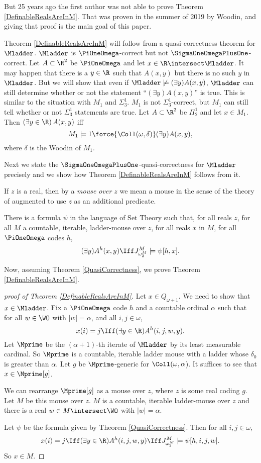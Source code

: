 \documentclass[oneside,12pt]{amsart}
\begin{document}
But 25 years ago the first author was not able to prove Theorem \ref{DefinableRealsAreInM}.
That was proven in the summer of 2019 by Woodin, and giving that proof is the
main goal of this paper.

Theorem \ref{DefinableRealsAreInM} will follow from a quasi-correctness theorem
for $\Mladder$. $\Mladder$ is $\PiOneOmega$-correct but not $\SigmaOneOmegaPlusOne$-correct.
Let $A\subset\R^2$ be $\PiOneOmega$ and let $x\in\R\intersect\Mladder$. It may
happen that there is a $y\in \R$ such that $A(x,y)$ but there is no such $y$
in $\Mladder$. But we will show that even if $\Mladder\not\models(\exists y) A(x,y)$,
$\Mladder$ can still determine whether or not the statement
``$(\exists y) A(x,y)$'' is true. This is similar to the situation with $M_1$ and
$\Sigma^1_3$. $M_1$ is not $\Sigma^1_3$-correct, but $M_1$ can still tell whether
or not $\Sigma^1_3$ statements are true. Let $A\subset\R^2$ be $\Pi^1_2$ and
let $x\in M_1$. Then $(\exists y\in\R)\, A(x,y)$ iff
$$M_1\models 1\force{\Coll(\omega,\delta)} (\exists y) A(x,y),$$
where $\delta$ is the Woodin of $M_1$.

Next we state the
$\SigmaOneOmegaPlusOne$-quasi-correctness for $\Mladder$ precisely and
we show how
Theorem \ref{DefinableRealsAreInM} follows from it.

If $z$ is a real, then by a \emph{mouse over $z$} we mean a mouse in the
sense of the theory of \cite{FSIT} augmented to use $z$ as an additional predicate.

\begin{theorem}
\label{QuasiCorrectness}
There is a formula $\psi$ in the language of Set Theory such that, for all
reals $z$, for all $M$ a countable, iterable, ladder-mouse over $z$,
for all reals $x$ in $M$,
for all $\PiOneOmega$ codes $h$,
$$(\exists y) A^h(x,y) \Iff J^M_{\omega_2^M} \models \psi[h,x].$$
\end{theorem}

Now, assuming Theorem \ref{QuasiCorrectness}, we prove Theorem \ref{DefinableRealsAreInM}.

\begin{proof}[proof of Theorem \ref{DefinableRealsAreInM}]
Let $x\in Q_{\omega+1}$. We need to show that $x\in\Mladder$.
Fix a $\PiOneOmega$ code $h$ and a countable ordinal $\alpha$ such that for
all $w\in\WO$ with $|w|=\alpha$, and all $i,j\in\omega$,
$$x(i)=j \Iff (\exists y\in\R)A^h(i,j,w,y).$$
Let $\Mprime$ be the $(\alpha+1)$-th iterate of $\Mladder$ by its least
measurable cardinal. So $\Mprime$ is a countable, iterable ladder mouse with
a ladder whose $\delta_0$ is greater than $\alpha$. Let $g$ be $\Mprime$-generic
for $\Coll(\omega,\alpha$). It suffices to see that $x\in\Mprime[g]$.

We can rearrange $\Mprime[g]$ as a mouse over $z$, where $z$ is some real coding $g$.
Let $M$ be this mouse over $z$. $M$ is a countable, iterable ladder-mouse over $z$ and there
is a real $w\in M\intersect\WO$ with $|w|=\alpha$.

Let $\psi$ be the formula given by Theorem \ref{QuasiCorrectness}. Then for all
$i,j\in\omega$,
$$x(i)=j \Iff (\exists y\in\R)A^h(i,j,w,y) \Iff J^M_{\omega_2^M} \models \psi[h,i,j,w].$$
So $x\in M$.
\end{proof}
\end{document}
